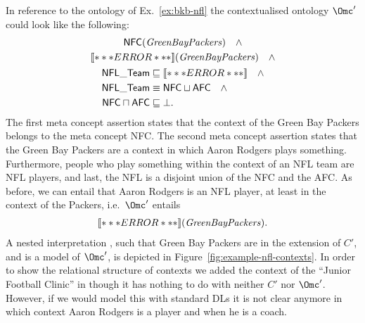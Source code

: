 \begin{example}
  In reference to the ontology \Omc of Ex.~\ref{ex:bkb-nfl} the contextualised ontology $\Omc'$
  could look like the following:
  \begin{gather*}
    \mathsf{NFC}(\text{\textit{GreenBayPackers}}) \quad\land\\ 
    \oax{(\exists\plays.\top)(\text{\textit{AaronRodgers}})}(\text{\textit{GreenBayPackers}})
    \quad\land\\ 
    \begin{aligned}
      \mathsf{NFL\_Team} & \sqsubseteq \oax{\exists\plays.\top \sqsubseteq
        \mathsf{NFL\_Player}}\quad\land\\ 
      \mathsf{NFL\_Team} & \equiv \mathsf{NFC} \sqcup \mathsf{AFC}\quad\land\\
      \mathsf{NFC} \sqcap \mathsf{AFC} & \sqsubseteq \bot.
    \end{aligned}
  \end{gather*}
  The first meta concept assertion states that the context of the Green Bay Packers belongs to the
  meta concept NFC. The second meta concept assertion states that the Green Bay Packers are a
  context in which Aaron Rodgers plays something. Furthermore, people who play something within the
  context of an NFL team are NFL players, and last, the NFL is a disjoint union of the NFC and the
  AFC. As before, we can entail that Aaron Rodgers is an NFL player, at least in the context of the
  Packers, i.e.\ $\Omc'$ entails
  \begin{gather*}
    \oax{\mathsf{NFL\_Player}(\text{\textit{AaronRodgers}})}(\text{\textit{GreenBayPackers}}).
  \end{gather*}
  A nested interpretation \J, such that Green Bay Packers are in the extension of $C'$, and \J is a
  model of $\Omc'$, is depicted in Figure~\ref{fig:example-nfl-contexts}.  In order to show the
  relational structure of contexts we added the context of the \enquote{Junior Football Clinic} in \J
  though it has nothing to do with neither $C'$ nor $\Omc'$. However, if we would model this with
  standard DLs it is not clear anymore in which context Aaron Rodgers is a player and when he is a
  coach.
\end{example}

